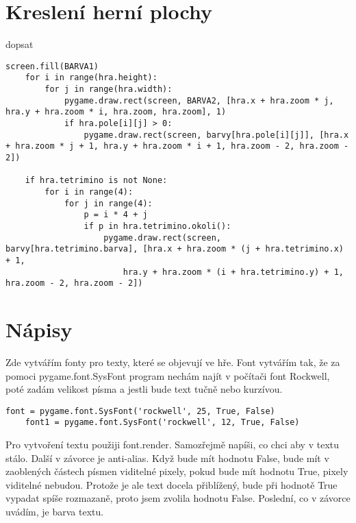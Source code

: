 \documentclass[12pt]{report}			%
\begin{document}
\section{Kreslení herní plochy}
dopsat
\begin{lstlisting}[title={Program tetris.py}, caption={Kreslení herní plochy}, 							label={lst:tetris.py}]
    screen.fill(BARVA1)    
    for i in range(hra.height):
        for j in range(hra.width):
            pygame.draw.rect(screen, BARVA2, [hra.x + hra.zoom * j, hra.y + hra.zoom * i, hra.zoom, hra.zoom], 1)
            if hra.pole[i][j] > 0:
                pygame.draw.rect(screen, barvy[hra.pole[i][j]], [hra.x + hra.zoom * j + 1, hra.y + hra.zoom * i + 1, hra.zoom - 2, hra.zoom - 2]) 

    if hra.tetrimino is not None:
        for i in range(4):
            for j in range(4):
                p = i * 4 + j
                if p in hra.tetrimino.okoli():
                    pygame.draw.rect(screen, barvy[hra.tetrimino.barva], [hra.x + hra.zoom * (j + hra.tetrimino.x) + 1,
                        hra.y + hra.zoom * (i + hra.tetrimino.y) + 1, hra.zoom - 2, hra.zoom - 2])
\end{lstlisting}
		\section{Nápisy}
Zde vytvářím fonty pro texty, které se objevují ve hře. Font vytvářím tak, že za pomoci pygame.font.SysFont program nechám najít v počítači font Rockwell, poté zadám velikost písma a jestli bude text tučně nebo kurzívou.
\begin{lstlisting}[title={Program tetris.py}, caption={Fonty}, 							label={lst:tetris.py}]
    font = pygame.font.SysFont('rockwell', 25, True, False)
    font1 = pygame.font.SysFont('rockwell', 12, True, False)
\end{lstlisting}
Pro vytvoření textu použiji font.render. Samozřejmě napíši, co chci aby v textu stálo. Další v závorce je anti-alias. Když bude mít hodnotu False, bude mít v zaoblených částech písmen viditelné pixely, pokud bude mít hodnotu True, pixely viditelné nebudou. Protože je ale text docela přiblížený, bude při hodnotě True vypadat spíše rozmazaně, proto jsem zvolila hodnotu False. Poslední, co v závorce uvádím, je barva textu.
\end{document}
